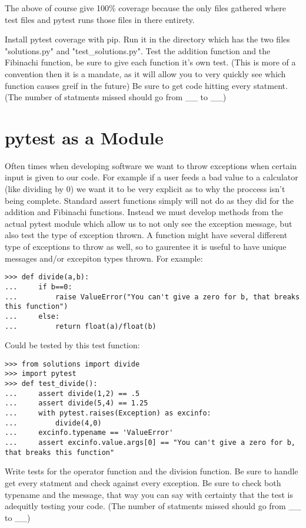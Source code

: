 The above of course give 100\% coverage because the only files gathered where test files and pytest runs those files in there entirety.

\begin{problem}
Install pytest coverage with pip.
Run it in the directory which has the two files "solutions.py" and "test\_solutions.py".
Test the addition function and the Fibinachi function, be sure to give each function it's own test. (This is more of a convention then it is a mandate,
as it will allow you to very quickly see which function causes greif in the future) Be sure to get code hitting every statment.
(The number of statments missed should go from \_\_ to \_\_)
\end{problem}

\section*{pytest as a Module}

Often times when developing software we want to throw exceptions when certain input is given to our code.
For example if a user feeds a bad value to a calculator (like dividing by 0) we want it to be very explicit as to why the proccess isn't being complete.
Standard assert functions simply will not do as they did for the addition and Fibinachi functions.
Instead we must develop methods from the actual pytest module which allow us to not only see the exception message, but also test the type of exception thrown.
A function might have several different type of exceptions to throw as well, so to gaurentee it is useful to have unique messages and/or excepiton types thrown.
For example:

\begin{lstlisting}
>>> def divide(a,b):
...     if b==0:
...         raise ValueError("You can't give a zero for b, that breaks this function")
...     else:
...         return float(a)/float(b)
\end{lstlisting}
Could be tested by this test function:
\begin{lstlisting}
>>> from solutions import divide
>>> import pytest
>>> def test_divide():
...     assert divide(1,2) == .5
...     assert divide(5,4) == 1.25
...     with pytest.raises(Exception) as excinfo:
...         divide(4,0)
...     excinfo.typename == 'ValueError'
...     assert excinfo.value.args[0] == "You can't give a zero for b, that breaks this function"
\end{lstlisting}

\begin{problem}
Write tests for the operator function and the division function. Be sure to handle get every statment and check against every exception.
Be sure to check both typename and the message, that way you can say with certainty that the test is adequitly testing your code.
(The number of statments missed should go from \_\_ to \_\_)
\end{problem}

